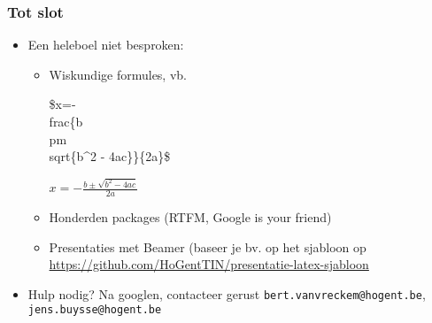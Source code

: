 \documentclass[aspectratio=169]{beamer}
\begin{document}
\begin{frame}
  \frametitle{Tot slot}
  
  \begin{itemize}
    \item Een heleboel niet besproken:
    \begin{itemize}
      \item<+-> Wiskundige formules, vb.
      \begin{semiverbatim}
        \$x=-\\frac\{b \\pm \\sqrt\{b\^{}2 - 4ac\}\}\{2a\}\$
      \end{semiverbatim}
      $x=-\frac{b \pm \sqrt{b^2 - 4ac}}{2a}$
      \item<+-> Honderden packages (RTFM, Google is your friend)
      \item<+-> Presentaties met Beamer (baseer je bv. op het sjabloon op \url{https://github.com/HoGentTIN/presentatie-latex-sjabloon}
      
    \end{itemize}
    \item<+-> Hulp nodig? Na googlen, contacteer gerust \texttt{bert.vanvreckem@hogent.be}, \texttt{jens.buysse@hogent.be}
  \end{itemize}
\end{frame}
\end{document}
